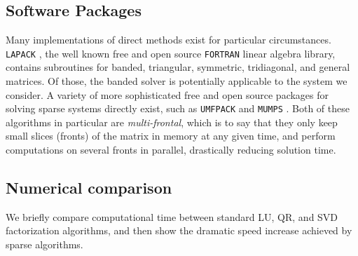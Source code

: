 \documentclass[10pt]{article}
\begin{document}
\begin{multicols}{2}
\subsection{Software Packages}
Many implementations of direct methods exist for particular circumstances.
\texttt{LAPACK} \citep{anderson_lapack_1999}, the well known free and open source \texttt{FORTRAN} linear algebra library, contains subroutines for banded, triangular, symmetric, tridiagonal, and general matrices.
Of those, the banded solver is potentially applicable to the system we consider.
A variety of more sophisticated free and open source packages for solving sparse systems directly exist, such as \texttt{UMFPACK} \citep{davis_algorithm_2004} and \texttt{MUMPS} \citep{amestoy_mumps:_2001}.
Both of these algorithms in particular are \textit{multi-frontal}, which is to say that they only keep small slices (fronts) of the matrix in memory at any given time, and perform computations on several fronts in parallel, drastically reducing solution time.

\subsection{Numerical comparison}
We briefly compare computational time between standard LU, QR, and SVD factorization algorithms, and then show the dramatic speed increase achieved by sparse algorithms.


\end{multicols}
\end{document}
